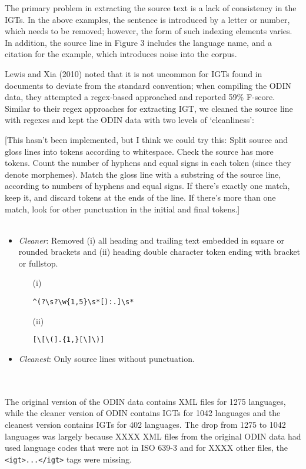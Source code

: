 \noindent The primary problem in extracting the source text is a lack of consistency in the IGTs. In the above examples, the sentence is introduced by a letter or number, which needs to be removed; however, the form of such indexing elements varies. In addition, the source line in Figure 3 includes the language name, and a citation for the example, which introduces noise into the corpus.

Lewis and Xia (2010) noted that it is not uncommon for IGTs found in documents to deviate from the standard convention; when compiling the ODIN data, they attempted a regex-based approached and reported 59\% F-score. Similar to their regex approaches for extracting IGT, we cleaned the source line with regexes and kept the ODIN data with two levels of `cleanliness':

[This hasn't been implemented, but I think we could try this: Split source and gloss lines into tokens according to whitespace. Check the source has more tokens. Count the number of hyphens and equal signs in each token (since they denote morphemes). Match the gloss line with a substring of the source line, according to numbers of hyphens and equal signs. If there's exactly one match, keep it, and discard tokens at the ends of the line. If there's more than one match, look for other punctuation in the initial and final tokens.]
\\ \\
\begin{minipage}{\columnwidth}
\begin{itemize}
\item \emph{Cleaner}: Removed (i) all heading and trailing text embedded in square or rounded brackets and (ii) heading double character token ending with bracket or fullstop.
\begin{itemize}
\item[(i)]
\begin{Verbatim}
^(?\s?\w{1,5}\s*[):.]\s*
\end{Verbatim}
\item[(ii)] 
\begin{Verbatim}
[\[\(].{1,}[\]\)]
\end{Verbatim}
\end{itemize}
\item \emph{Cleanest}: Only source lines without punctuation.
\end{itemize}
\end{minipage}
\\ \\

\noindent The original version of the ODIN data contains XML files for 1275 languages, while the cleaner version of ODIN contains IGTs for 1042 languages and the cleanest version contains IGTs for 402 languages. The drop from 1275 to 1042 languages was largely because {\color{red} XXXX} XML files from the original ODIN data had used language codes that were not in ISO 639-3 and for {\color{red} XXXX} other files, the \texttt{<igt>...</igt>} tags were missing. 



